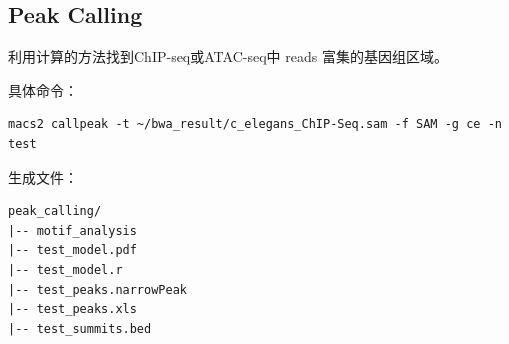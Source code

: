 \documentclass[UTF8]{ctexart}
\begin{document}
\subsection{Peak Calling}

利用计算的方法找到ChIP-seq或ATAC-seq中 reads 富集的基因组区域。

具体命令：

\begin{lstlisting}
macs2 callpeak -t ~/bwa_result/c_elegans_ChIP-Seq.sam -f SAM -g ce -n test
\end{lstlisting}

生成文件：

\begin{lstlisting}
peak_calling/
|-- motif_analysis
|-- test_model.pdf
|-- test_model.r
|-- test_peaks.narrowPeak
|-- test_peaks.xls
|-- test_summits.bed
\end{lstlisting}
\end{document}
